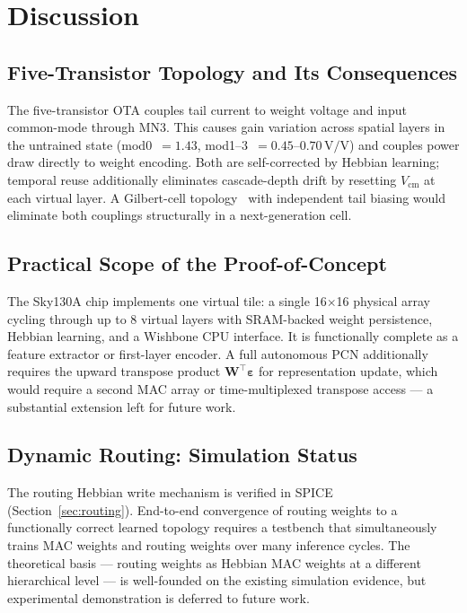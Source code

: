 \documentclass[journal,10pt,twoside]{IEEEtran}
\begin{document}
\section{Discussion}
\label{sec:discussion}

\subsection{Five-Transistor Topology and Its Consequences}

The five-transistor OTA couples tail current to weight voltage and input
common-mode through MN3.
This causes gain variation across spatial layers in the untrained state
(mod0~$= 1.43$, mod1--3~$= 0.45$--$0.70\,\text{V/V}$) and couples power
draw directly to weight encoding.
Both are self-corrected by Hebbian learning; temporal reuse additionally
eliminates cascade-depth drift by resetting $V_\text{cm}$ at each virtual
layer.
A Gilbert-cell topology~\cite{gilbert1968precise} with independent tail
biasing would eliminate both couplings structurally in a next-generation cell.

\subsection{Practical Scope of the Proof-of-Concept}

The Sky130A chip implements one virtual tile: a single 16$\times$16
physical array cycling through up to 8 virtual layers with SRAM-backed
weight persistence, Hebbian learning, and a Wishbone CPU interface.
It is functionally complete as a feature extractor or first-layer encoder.
A full autonomous PCN additionally requires the upward transpose product
$\mathbf{W}^\top\boldsymbol{\varepsilon}$ for representation update,
which would require a second MAC array or time-multiplexed transpose
access — a substantial extension left for future work.

\subsection{Dynamic Routing: Simulation Status}

The routing Hebbian write mechanism is verified in SPICE
(Section~\ref{sec:routing}).
End-to-end convergence of routing weights to a functionally correct learned
topology requires a testbench that simultaneously trains MAC weights and
routing weights over many inference cycles.
The theoretical basis — routing weights as Hebbian MAC weights at a different
hierarchical level — is well-founded on the existing simulation evidence,
but experimental demonstration is deferred to future work.
\end{document}
